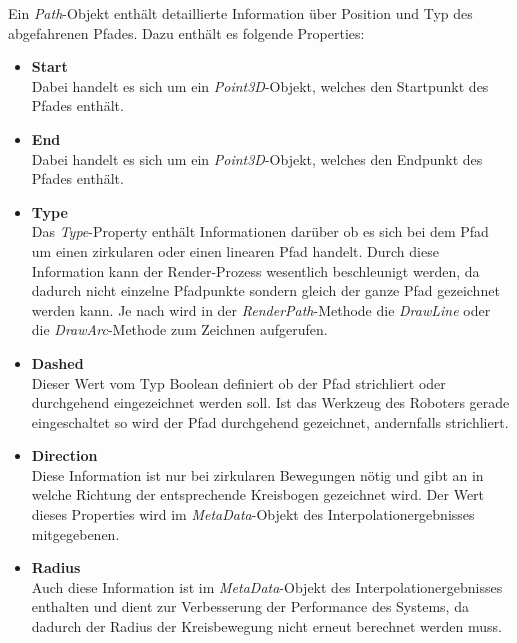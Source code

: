 Ein \textit{Path}-Objekt enthält detaillierte Information über Position und Typ des abgefahrenen Pfades. Dazu enthält es folgende Properties:
\begin{itemize}
\item \textbf{Start}\\
Dabei handelt es sich um ein \textit{Point3D}-Objekt, welches den Startpunkt des Pfades enthält.
\item \textbf{End}\\
Dabei handelt es sich um ein \textit{Point3D}-Objekt, welches den Endpunkt des Pfades enthält.
\item \textbf{Type}\\
Das \textit{Type}-Property enthält Informationen darüber ob es sich bei dem Pfad um einen zirkularen oder einen linearen Pfad handelt. Durch diese Information kann der Render-Prozess wesentlich beschleunigt werden, da dadurch nicht einzelne Pfadpunkte sondern gleich der ganze Pfad gezeichnet werden kann.
Je nach wird in der \textit{RenderPath}-Methode die \textit{DrawLine} oder die \textit{DrawArc}-Methode zum Zeichnen aufgerufen.
\item \textbf{Dashed}\\
Dieser Wert vom Typ Boolean definiert ob der Pfad strichliert oder durchgehend eingezeichnet werden soll. Ist das Werkzeug des Roboters gerade eingeschaltet so wird der Pfad durchgehend gezeichnet, andernfalls strichliert.
\item \textbf{Direction}\\
Diese Information ist nur bei zirkularen Bewegungen nötig und gibt an in welche Richtung der entsprechende Kreisbogen gezeichnet wird. Der Wert dieses Properties wird im \textit{MetaData}-Objekt des Interpolationergebnisses mitgegebenen.
\item \textbf{Radius}\\
Auch diese Information ist im \textit{MetaData}-Objekt des Interpolationergebnisses enthalten und dient zur Verbesserung der Performance des Systems, da dadurch der Radius der Kreisbewegung nicht erneut berechnet werden muss.

\end{itemize}
